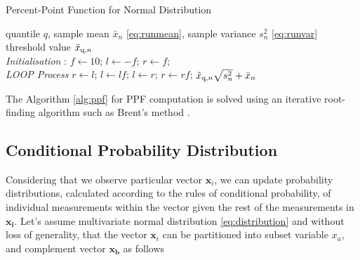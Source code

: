 \begin{algorithm}[H]
\caption{{Percent-Point Function for Normal Distribution}} \label{alg:ppf}
 \begin{algorithmic}[1]
 \renewcommand{\algorithmicrequire}{\textbf{Input:}}
 \renewcommand{\algorithmicensure}{\textbf{Output:}}
 \REQUIRE quantile $q$, sample mean $\bar x_n$ \eqref{eq:runmean}, sample variance $s^2_n$ \eqref{eq:runvar}
 \ENSURE threshold value $\tilde{x} _{\text{q}, n}$
 \\ \textit{Initialisation} :
 \STATE $f \leftarrow 10$; $l \leftarrow -f $; $r \leftarrow f;$
 \\ \textit{LOOP Process}
 \STATE $r \leftarrow l $;
 \STATE $l \leftarrow lf $;
 \ENDWHILE
 \STATE $l \leftarrow r $;
 \STATE $r \leftarrow rf $;
 \ENDWHILE
 \RETURN $\tilde{x} _{\text{q}, n} \sqrt{s^2_n} + \bar x_n $
 \end{algorithmic}
\end{algorithm}

The Algorithm \ref{alg:ppf} for PPF computation is solved using an iterative root-finding algorithm such as Brent's method \cite{Brent72}.

\subsection{Conditional Probability Distribution}\label{AA:Conditional}
Considering that we observe particular vector $\boldsymbol{x}_i$, we can update probability distributions, calculated according to the rules of conditional probability, of individual measurements within the vector given the rest of the measurements in $\boldsymbol{x_{i}}$.
Let's assume multivariate normal distribution \eqref{eq:distribution} and without loss of generality, that the vector $\boldsymbol{x}_i$ can be partitioned into subset variable $x_a$, and complement vector $\boldsymbol{x_b}$ as follows

